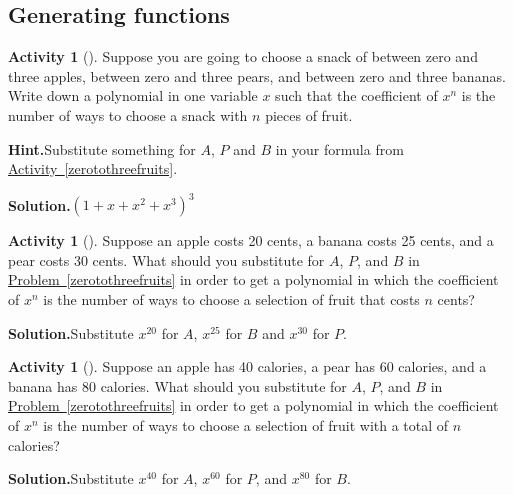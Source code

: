 \documentclass[10pt,]{book}
\theoremstyle{plain}
\theoremstyle{definition}
\newtheorem{activity}[project]{Activity}
\numberwithin{equation}{chapter}
\begin{document}
\subsection[{Generating functions}]{Generating functions}\label{subsection-41}
\begin{activity}[]\label{activity-171}
Suppose you are going to choose a snack of between zero and three apples, between zero and three pears, and between zero and three bananas. Write down a polynomial in one variable \(x\) such that the coefficient of \(x^n\) is the number of ways to choose a snack with \(n\) pieces of fruit.%
\par\medskip\noindent%
\textbf{Hint.}\quad Substitute something for \(A\), \(P\) and \(B\) in your formula from \hyperref[zerotothreefruits]{Activity~\ref{zerotothreefruits}}.%
\par\medskip\noindent%
\textbf{Solution.}\quad \((1+x+x^2+x^3)^3\)%
\end{activity}
\begin{activity}[]\label{activity-172}
Suppose an apple costs 20 cents, a banana costs 25 cents, and a pear costs 30 cents. What should you substitute for \(A\), \(P\), and \(B\) in \hyperref[zerotothreefruits]{Problem~\ref{zerotothreefruits}} in order to get a polynomial in which the coefficient of \(x^n\) is the number of ways to choose a selection of fruit that costs \(n\) cents?%
\par\medskip\noindent%
\textbf{Solution.}\quad Substitute \(x^{20}\) for \(A\), \(x^{25}\) for \(B\) and \(x^{30}\) for \(P\).%
\end{activity}
\begin{activity}[]\label{activity-173}
Suppose an apple has 40 calories, a pear has 60 calories, and a banana has 80 calories. What should you substitute for \(A\), \(P\), and \(B\) in \hyperref[zerotothreefruits]{Problem~\ref{zerotothreefruits}} in order to get a polynomial in which the coefficient of \(x^n\) is the number of ways to choose a selection of fruit with a total of \(n\) calories?%
\par\medskip\noindent%
\textbf{Solution.}\quad Substitute \(x^{40}\) for \(A\), \(x^{60}\) for \(P\), and \(x^{80}\) for \(B\).%
\end{activity}
\end{document}
